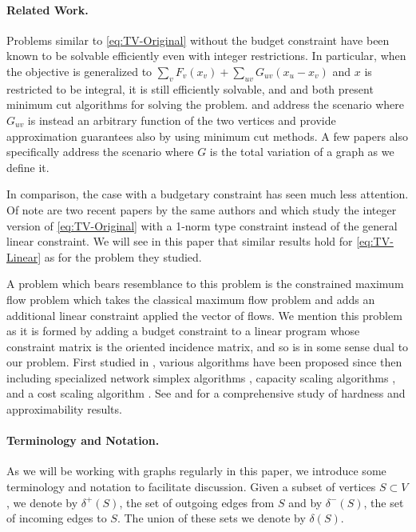 \documentclass[titlepage,11pt]{article}
\begin{document}
\paragraph{Related Work.}
Problems similar to \eqref{eq:TV-Original} without the budget constraint have been known to be solvable efficiently even with integer restrictions. In particular, when the objective is generalized to $\sum_v F_v(x_v) + \sum_{uv} G_{uv}(x_u - x_v)$ and $x$ is restricted to be integral, it is still efficiently solvable, and \cite{ahuja2004cut} and \cite{hochbaum2001efficient} both present minimum cut algorithms for solving the problem. \cite{boykov2002fast} and \cite{boykov2004experimental} address the scenario where $G_{uv}$ is instead an arbitrary function of the two vertices and provide approximation guarantees also by using minimum cut methods. A few papers \cite{zalesky2002network,chambolle2005total} also specifically address the scenario where $G$ is the total variation of a graph as we define it.

In comparison, the case with a budgetary constraint has seen much less attention. Of note are two recent papers by the same authors \cite{severitt2023efficient} and \cite{manns2024discrete} which study the integer version of \eqref{eq:TV-Original} with a 1-norm type constraint instead of the general linear constraint. We will see in this paper that similar results hold for \eqref{eq:TV-Linear} as for the problem they studied.

A problem which bears resemblance to this problem is the constrained maximum flow problem which takes the classical maximum flow problem and adds an additional linear constraint applied the vector of flows. We mention this problem as it is formed by adding a budget constraint to a linear program whose constraint matrix is the oriented incidence matrix, and so is in some sense dual to our problem. First studied in \cite{ahuja1995capacity}, various algorithms have been proposed since then including specialized network simplex algorithms \cite{ccalicskan2011specialized, holzhauser2017network}, capacity scaling algorithms \cite{ccalicskan2009capacity}, and a cost scaling algorithm \cite{ccalicskan2012faster}. See \cite{holzhauser2016budget} and \cite{holzhauser2017complexity} for a comprehensive study of hardness and approximability results.

\paragraph{Terminology and Notation.} 
As we will be working with graphs regularly in this paper, we introduce some terminology and notation to facilitate discussion. Given a subset of vertices $S \subset V$, we denote by $\delta^+(S)$, the set of outgoing edges from $S$ and by $\delta^-(S)$, the set of incoming edges to $S$. The union of these sets we denote by $\delta(S)$. 
\end{document}
